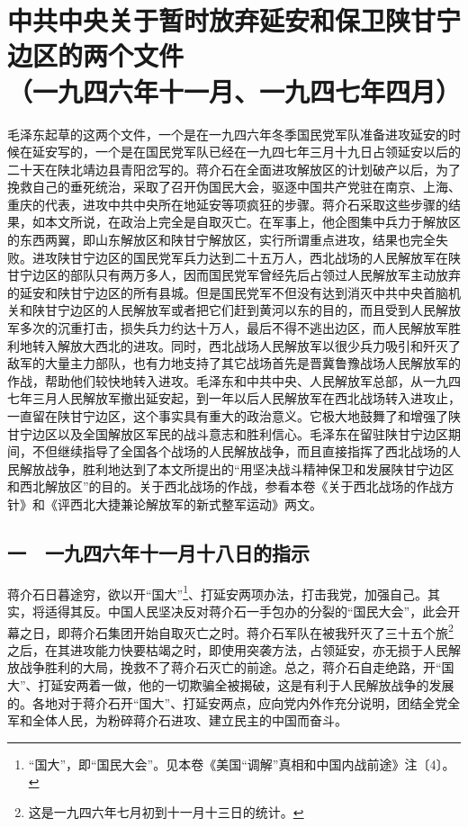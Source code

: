 \documentclass[cn,11pt,chinese]{elegantbook}
\def\myformat#1{\hfil\hfil #1}
\begin{document}
\newpage\section*{\myformat{中共中央关于暂时放弃延安和保卫陕甘宁边区的两个文件}\\\myformat{（一九四六年十一月、一九四七年四月）}}
\begin{introduction}\item  毛泽东起草的这两个文件，一个是在一九四六年冬季国民党军队准备进攻延安的时候在延安写的，一个是在国民党军队已经在一九四七年三月十九日占领延安以后的二十天在陕北靖边县青阳岔写的。蒋介石在全面进攻解放区的计划破产以后，为了挽救自己的垂死统治，采取了召开伪国民大会，驱逐中国共产党驻在南京、上海、重庆的代表，进攻中共中央所在地延安等项疯狂的步骤。蒋介石采取这些步骤的结果，如本文所说，在政治上完全是自取灭亡。在军事上，他企图集中兵力于解放区的东西两翼，即山东解放区和陕甘宁解放区，实行所谓重点进攻，结果也完全失败。进攻陕甘宁边区的国民党军兵力达到二十五万人，西北战场的人民解放军在陕甘宁边区的部队只有两万多人，因而国民党军曾经先后占领过人民解放军主动放弃的延安和陕甘宁边区的所有县城。但是国民党军不但没有达到消灭中共中央首脑机关和陕甘宁边区的人民解放军或者把它们赶到黄河以东的目的，而且受到人民解放军多次的沉重打击，损失兵力约达十万人，最后不得不逃出边区，而人民解放军胜利地转入解放大西北的进攻。同时，西北战场人民解放军以很少兵力吸引和歼灭了敌军的大量主力部队，也有力地支持了其它战场首先是晋冀鲁豫战场人民解放军的作战，帮助他们较快地转入进攻。毛泽东和中共中央、人民解放军总部，从一九四七年三月人民解放军撤出延安起，到一年以后人民解放军在西北战场转入进攻止，一直留在陕甘宁边区，这个事实具有重大的政治意义。它极大地鼓舞了和增强了陕甘宁边区以及全国解放区军民的战斗意志和胜利信心。毛泽东在留驻陕甘宁边区期间，不但继续指导了全国各个战场的人民解放战争，而且直接指挥了西北战场的人民解放战争，胜利地达到了本文所提出的“用坚决战斗精神保卫和发展陕甘宁边区和西北解放区”的目的。关于西北战场的作战，参看本卷《关于西北战场的作战方针》和《评西北大捷兼论解放军的新式整军运动》两文。\end{introduction}
\subsection*{\myformat{一　一九四六年十一月十八日的指示}}
蒋介石日暮途穷，欲以开“国大”\footnote[1]{ “国大”，即“国民大会”。见本卷《美国“调解”真相和中国内战前途》注〔4〕。}、打延安两项办法，打击我党，加强自己。其实，将适得其反。中国人民坚决反对蒋介石一手包办的分裂的“国民大会”，此会开幕之日，即蒋介石集团开始自取灭亡之时。蒋介石军队在被我歼灭了三十五个旅\footnote[2]{ 这是一九四六年七月初到十一月十三日的统计。}之后，在其进攻能力快要枯竭之时，即使用突袭方法，占领延安，亦无损于人民解放战争胜利的大局，挽救不了蒋介石灭亡的前途。总之，蒋介石自走绝路，开“国大”、打延安两着一做，他的一切欺骗全被揭破，这是有利于人民解放战争的发展的。各地对于蒋介石开“国大”、打延安两点，应向党内外作充分说明，团结全党全军和全体人民，为粉碎蒋介石进攻、建立民主的中国而奋斗。\\
\end{document}
